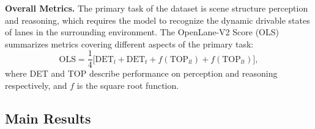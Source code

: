 \begin{table}[t!]
    \centering
    \caption{\textbf{Ablation on traffic element embedding.} TE embedding is necessary to deal with inconsistency in the feature space of different queries.}
    \label{tab:ablation-embedding}
    \vspace{-5px}
\end{table} 



\smallskip
\noindent
\textbf{Overall Metrics.}
The primary task of the dataset is scene structure perception and reasoning, which requires the model to recognize the dynamic drivable states of lanes in the surrounding environment.
The OpenLane-V2 Score (OLS) summarizes metrics covering different aspects of the primary task:
\begin{equation}
    \text{OLS} = \frac{1}{4} \bigg[ \text{DET}_{l} + \text{DET}_{t} + f(\text{TOP}_{ll}) + f(\text{TOP}_{lt}) \bigg],
\end{equation}
where DET and TOP describe performance on perception and reasoning respectively, and $f$ is the square root function. 


\subsection{Main Results}
\label{sec:exp-results}

